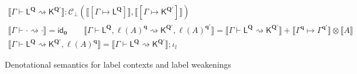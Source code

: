\documentclass[acmsmall,screen,review]{acmart}
\newcommand{\mc}[1]{\ensuremath{\mathcal{#1}}}
\newcommand{\mb}[1]{\ensuremath{\mathbf{#1}}}
\newcommand{\ms}[1]{\ensuremath{\mathsf{#1}}}
\newcommand{\cwk}[2]{#1 \mapsto #2}
\newcommand{\lwk}[3]{#1 \vdash #2 \rightsquigarrow #3}
\newcommand{\lhyp}[2]{#1(#2)}
\newcommand{\ltoty}[2]{[#1 \mapsto #2]}
\newcommand{\dnt}[1]{\llbracket{#1}\rrbracket}
\begin{document}
\begin{figure}
  \begin{gather*}
    \boxed{\dnt{\lwk{\Gamma}{\ms{L}^{\mb{Q}}}{\ms{K}^{\mb{Q}'}}} 
      : \mc{C}_\bot(\dnt{\ltoty{\Gamma}{\ms{L}^{\mb{Q}}}}, 
                    \dnt{\ltoty{\Gamma}{\ms{K}^{\mb{Q}'}}})} \\
    \dnt{\lwk{\Gamma}{\cdot}{\cdot}} = \ms{id}_{\mb{0}} \qquad
    \dnt
      {\lwk{\Gamma}{\ms{L}^{\mb{Q}}, \lhyp{\ell}{A}^{\mb{q}}}
      {\ms{K}^{\mb{Q}'}, \lhyp{\ell}{A}^{\mb{q}'}}}
    = \dnt{\lwk{\Gamma}{\ms{L}^{\mb{Q}}}{\ms{K}^{\mb{Q}'}}} 
      + \dnt{\cwk{\Gamma^{\mb{q}}}{\Gamma^{\mb{q}'}}} \otimes \dnt{A} \\
    \dnt
      {\lwk{\Gamma}{\ms{L}^{\mb{Q}}}
      {\ms{K}^{\mb{Q}'}, \lhyp{\ell}{A}^{\mb{q}}}}
    = \dnt{\lwk{\Gamma}{\ms{L}^{\mb{Q}}}{\ms{K}^{\mb{Q}'}}} ; \iota_l
  \end{gather*}
  \caption{Denotational semantics for label contexts and label weakenings}
  \Description{}
  \label{fig:lwk-densem}
\end{figure}
\end{document}
